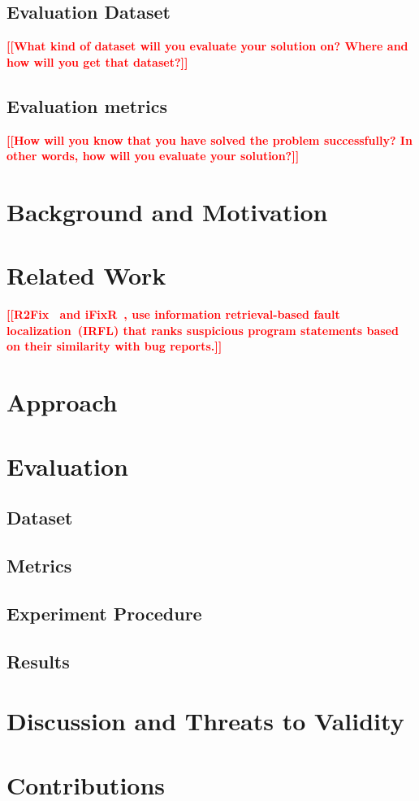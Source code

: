 \documentclass[conference]{IEEEtran}
\newcommand{\todo}[1]{\textcolor{red}{{\bfseries [[#1]]}}}
\begin{document}
\subsection{Evaluation Dataset}
    \todo{What kind of dataset will you evaluate your solution on? Where and how will you get that dataset?}

\subsection{Evaluation metrics}
    \todo{How will you know that you have solved the problem successfully? In other words, how will you evaluate your solution?}


\section{Background and Motivation}
\label{sec:background-and-motivation}

\section{Related Work}
\label{sec:relatedwork}
\todo{R2Fix~\cite{Liu13} and iFixR~\cite{Koyuncu19}, use information retrieval-based fault localization~(IRFL)
that ranks suspicious program statements based on their similarity with bug reports.}

\section{Approach}
\label{sec:approach}

\section{Evaluation}
\label{sec:evaluation}

\subsection{Dataset}
\label{sec:dataset}

\subsection{Metrics}
\label{sec:metrics}

\subsection{Experiment Procedure}
\label{sec:experiment-procedure}

\subsection{Results}
\label{sec:results}

\section{Discussion and Threats to Validity}
\label{sec:dicussion}

\section{Contributions}
\label{sec:contributions}



\end{document}
